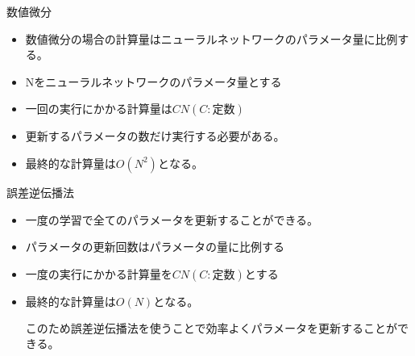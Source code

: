 数値微分\\
\begin{itemize}
\item{数値微分の場合の計算量はニューラルネットワークのパラメータ量に比例する。}
\item{Nをニューラルネットワークのパラメータ量とする}
\item{$一回の実行にかかる計算量はCN(C:定数)$}
\item{更新するパラメータの数だけ実行する必要がある。}
\item{$最終的な計算量はO(N^2)となる。$}
\end{itemize}

誤差逆伝播法
\begin{itemize}
\item{一度の学習で全てのパラメータを更新することができる。}
\item{パラメータの更新回数はパラメータの量に比例する}
\item{$一度の実行にかかる計算量をCN(C:定数)とする$}
\item{$最終的な計算量はO(N)となる。$}

このため誤差逆伝播法を使うことで効率よくパラメータを更新することができる。
\end{itemize}
\begin{flushright}
\end{flushright}